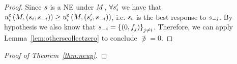 \begin{proof}
Since $s$ is a NE under $M$, $\forall s_i'$ we have that 
    $u^{\rm c}_{i}\left(M, \left(s_i, s_{-i}\right)\right)
    \geq 
    u^{\rm c}_{i}\left(M,\left(s_i', s_{-i}\right)\right)$,
i.e. $s_i$ is the best response to $s_{-i}$. 
By hypothesis we also know that $s_{-i}=\left\{(0,f_j)\right\}_{j\neq i}$. Therefore, we can apply Lemma~\ref{lem:otherscollectzero} to conclude $\nni=0$. 
\end{proof}

\begin{proof}[Proof of Theorem~\ref{thm:neup}]
        

\end{proof}
